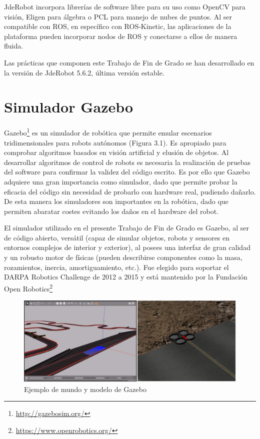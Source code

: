 JdeRobot incorpora librerías de software libre para su uso como OpenCV para visión, Eligen para álgebra o PCL para manejo de nubes de puntos. Al ser compatible con ROS, en específico con ROS-Kinetic, las aplicaciones de la plataforma pueden incorporar nodos de ROS y conectarse a ellos de manera fluida.

Las prácticas que componen este Trabajo de Fin de Grado se han desarrollado en la versión de JdeRobot 5.6.2, última versión estable.

\section{Simulador Gazebo}
Gazebo\footnote{\url{http://gazebosim.org/}} es un simulador de robótica que permite emular escenarios tridimensionales para robots autónomos (Figura 3.1). Es apropiado para comprobar algoritmos basados en visión artificial y elusión de objetos. Al desarrollar algoritmos de control de robots es necesaria la realización de pruebas del software para confirmar la validez del código escrito. Es por ello que Gazebo adquiere una gran importancia como simulador, dado que permite probar la eficacia del código sin necesidad de probarlo con hardware real, pudiendo dañarlo. De esta manera los simuladores son importantes en la robótica, dado que permiten abaratar costes evitando los daños en el hardware del robot.

El simulador utilizado en el presente Trabajo de Fin de Grado es Gazebo, al ser de código abierto, versátil (capaz de simular objetos, robots y sensores en entornos complejos de interior y exterior), al posees una interfaz de gran calidad y un robusto motor de físicas (pueden describirse componentes como la masa, rozamientos, inercia, amortiguamiento, etc.). Fue elegido para soportar el DARPA Robotics Challenge de 2012 a 2015 y está mantenido por la Fundación Open Robotics\footnote{\url{https://www.openrobotics.org/}}

\begin{figure}[H]
  \begin{center}
    \includegraphics[width=0.9\linewidth]{figures/gazeboworlds.png}
		\caption{Ejemplo de mundo y modelo de Gazebo}
		\label{fig.worlds}
		\end{center}
\end{figure}

